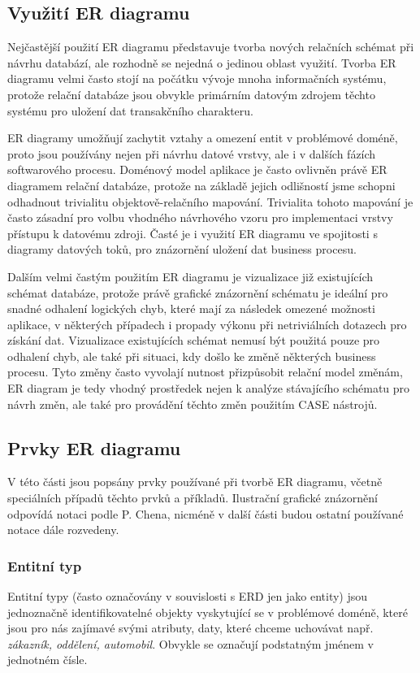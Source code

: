 \documentclass[czech,bachelor,public,dept460,male,oneside]{diploma}
\begin{document}
	\subsection{Využití ER diagramu}
	Nejčastější použití ER diagramu představuje tvorba nových relačních schémat při návrhu databází, ale rozhodně se nejedná o jedinou oblast využití. Tvorba ER diagramu velmi často stojí na počátku vývoje mnoha informačních systému, protože relační databáze jsou obvykle primárním datovým zdrojem těchto systému pro uložení dat transakčního charakteru. 
	
	ER diagramy umožňují zachytit vztahy a omezení entit v problémové doméně, proto jsou používány nejen při návrhu datové vrstvy, ale i v dalších fázích softwarového procesu. Doménový model aplikace je často ovlivněn právě ER diagramem relační databáze, protože na základě jejich odlišností jsme schopni odhadnout trivialitu objektově-relačního mapování. Trivialita tohoto mapování je často zásadní pro volbu vhodného návrhového vzoru pro implementaci vrstvy přístupu k datovému zdroji. Časté je i využití ER diagramu ve spojitosti s diagramy datových toků, pro znázornění uložení dat business procesu.
	
	Dalším velmi častým použitím ER diagramu je vizualizace již existujících schémat databáze, protože právě grafické znázornění schématu je ideální pro snadné odhalení logických chyb, které mají za následek omezené možnosti aplikace, v některých případech i propady výkonu při netriviálních dotazech pro získání dat. 
	Vizualizace existujících schémat nemusí být použitá pouze pro odhalení chyb, ale také při situaci, kdy došlo ke změně některých business procesu. Tyto změny často vyvolají nutnost přizpůsobit relační model změnám, ER diagram je tedy vhodný prostředek nejen k analýze stávajícího schématu pro návrh změn, ale také pro provádění těchto změn použitím CASE nástrojů.
	
	\subsection{Prvky ER diagramu}
	V této části jsou popsány prvky používané při tvorbě ER diagramu, včetně speciálních případů těchto prvků a příkladů. Ilustrační grafické znázornění odpovídá notaci podle P. Chena, nicméně v další části budou ostatní používané notace dále rozvedeny.
	
	\subsubsection{Entitní typ}
	Entitní typy (často označovány v souvislosti s ERD jen jako entity) jsou jednoznačně identifikovatelné objekty vyskytující se v problémové doméně, které jsou pro nás zajímavé svými atributy, daty, které chceme uchovávat např. \textit{zákazník, oddělení, automobil}. Obvykle se označují podstatným jménem v jednotném čísle. 
	
\end{document}
